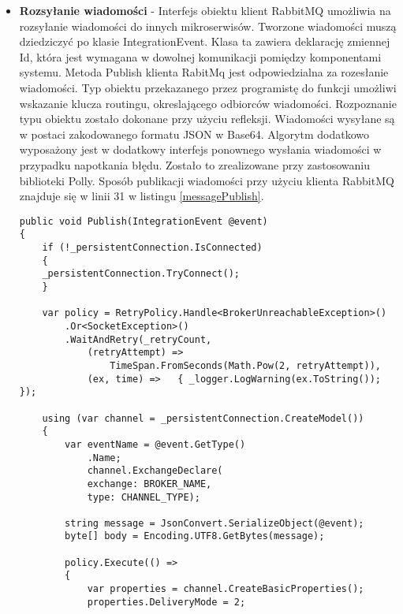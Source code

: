 \begin{itemize}
\item \textbf{Rozsyłanie wiadomości} - Interfejs obiektu klient RabbitMQ umożliwia na rozsyłanie wiadomości do innych mikroserwisów. Tworzone wiadomości muszą dziedziczyć po klasie IntegrationEvent. Klasa ta zawiera deklarację zmiennej Id, która jest wymagana w dowolnej komunikacji pomiędzy komponentami systemu. Metoda Publish klienta RabitMq jest odpowiedzialna za rozesłanie wiadomości. Typ obiektu przekazanego przez programistę do funkcji umożliwi wskazanie klucza routingu, okreslającego odbiorców wiadomości. Rozpoznanie typu obiektu zostało dokonane przy użyciu refleksji. Wiadomości wysyłane są w postaci zakodowanego formatu JSON w Base64. Algorytm dodatkowo wyposażony jest w dodatkowy interfejs ponownego wysłania wiadomości w przypadku napotkania błędu. Zostało to zrealizowane przy zastosowaniu biblioteki Polly. Sposób publikacji wiadomości przy użyciu klienta RabbitMQ znajduje się w linii 31 w listingu \ref{messagePublish}. 
\\
\begin{lstlisting}[caption={Metoda publikacji wiadomości.}, label={messagePublish}]
public void Publish(IntegrationEvent @event)
{
	if (!_persistentConnection.IsConnected)
	{
	_persistentConnection.TryConnect();
	}

	var policy = RetryPolicy.Handle<BrokerUnreachableException>()
		.Or<SocketException>()
		.WaitAndRetry(_retryCount, 
			(retryAttempt) => 
				TimeSpan.FromSeconds(Math.Pow(2, retryAttempt)), 
			(ex, time) =>	{ _logger.LogWarning(ex.ToString()); });

	using (var channel = _persistentConnection.CreateModel())
	{
		var eventName = @event.GetType()
			.Name;
			channel.ExchangeDeclare(
			exchange: BROKER_NAME,
			type: CHANNEL_TYPE);                
	
		string message = JsonConvert.SerializeObject(@event);
		byte[] body = Encoding.UTF8.GetBytes(message);
	
		policy.Execute(() =>
		{
			var properties = channel.CreateBasicProperties();
			properties.DeliveryMode = 2;
	

\end{lstlisting}
\end{itemize}
